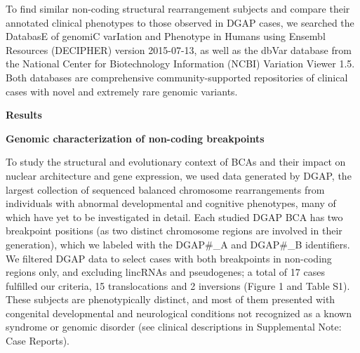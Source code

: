 \documentclass[a4paper,twoside=true,openright,parskip=full,chapterprefix=true,11pt,headings=normal,bibliography=totoc,listof=totoc,titlepage=on,captions=tableabove,draft=false]{scrreprt}
\theoremstyle{definition}
\theoremstyle{definition}
\theoremstyle{definition}
\theoremstyle{remark}
\begin{document}
To find similar non-coding structural rearrangement subjects and compare
their annotated clinical phenotypes to those observed in DGAP cases, we
searched the DatabasE of genomiC varIation and Phenotype in Humans using
Ensembl Resources (DECIPHER)\citep{Firth2009} version 2015-07-13, as
well as the dbVar database from the National Center for Biotechnology
Information (NCBI) Variation Viewer 1.5.\citep{Lappalainen2013} Both
databases are comprehensive community-supported repositories of clinical
cases with novel and extremely rare genomic variants.

\textbf{Results}

\textbf{Genomic characterization of non-coding breakpoints}

To study the structural and evolutionary context of BCAs and their
impact on nuclear architecture and gene expression, we used data
generated by DGAP,\citep{Higgins2008, Ligon2005, Kim2008, Lu2007} the
largest collection of sequenced balanced chromosome rearrangements from
individuals with abnormal developmental and cognitive phenotypes, many
of which have yet to be investigated in detail. Each studied DGAP BCA
has two breakpoint positions (as two distinct chromosome regions are
involved in their generation), which we labeled with the DGAP\#\_A and
DGAP\#\_B identifiers. We filtered DGAP data to select cases with both
breakpoints in non-coding regions only, and excluding lincRNAs and
pseudogenes; a total of 17 cases fulfilled our criteria, 15
translocations and 2 inversions (Figure 1 and Table S1). These subjects
are phenotypically distinct, and most of them presented with congenital
developmental and neurological conditions not recognized as a known
syndrome or genomic disorder (see clinical descriptions in Supplemental
Note: Case Reports).
\end{document}
